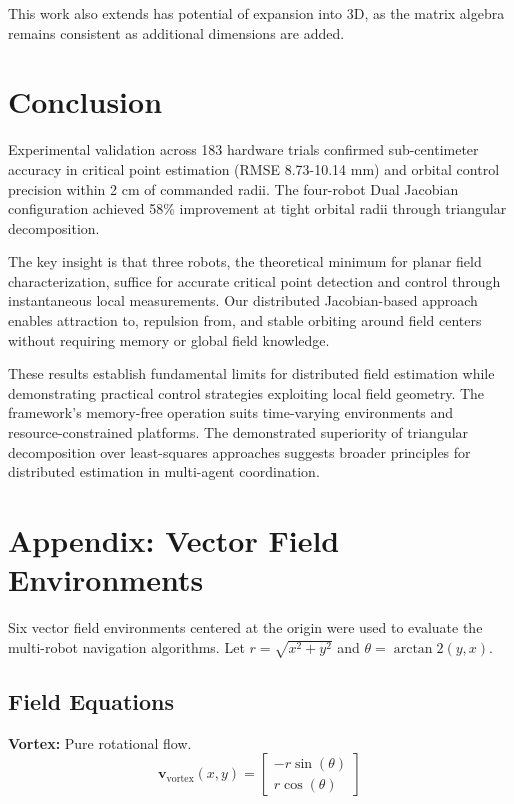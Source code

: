 \documentclass[lettersize,journal]{IEEEtran}
\begin{document}
This work also extends has potential of expansion into 3D, as the matrix algebra remains consistent as additional dimensions are added.


\section{Conclusion}
\noindent 
Experimental validation across 183 hardware trials confirmed sub-centimeter accuracy in critical point estimation (RMSE 8.73-10.14 mm) and orbital control precision within 2 cm of commanded radii. The four-robot Dual Jacobian configuration achieved 58\% improvement at tight orbital radii through triangular decomposition.

The key insight is that three robots, the theoretical minimum for planar field characterization, suffice for accurate critical point detection and control through instantaneous local measurements. Our distributed Jacobian-based approach enables attraction to, repulsion from, and stable orbiting around field centers without requiring memory or global field knowledge.

These results establish fundamental limits for distributed field estimation while demonstrating practical control strategies exploiting local field geometry. The framework's memory-free operation suits time-varying environments and resource-constrained platforms. The demonstrated superiority of triangular decomposition over least-squares approaches suggests broader principles for distributed estimation in multi-agent coordination.


\section{Appendix: Vector Field Environments}
\label{sec:appendix_vector_fields}

Six vector field environments centered at the origin were used to evaluate the multi-robot navigation algorithms. Let $r = \sqrt{x^2 + y^2}$ and $\theta = \arctan2(y, x)$.

\subsection{Field Equations}

\textbf{Vortex:} Pure rotational flow.
\begin{equation}
\mathbf{v}_{\text{vortex}}(x, y) = \begin{bmatrix} -r \sin(\theta) \\ r \cos(\theta) \end{bmatrix}
\end{equation}
\end{document}
